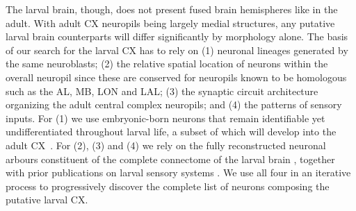     The larval brain, though, does not present fused brain hemispheres like in the adult.
    With adult CX neuropils being largely medial structures, any putative larval brain counterparts will differ significantly by morphology alone.
    The basis of our search for the larval CX has to rely on (1) neuronal lineages generated by the same neuroblasts; (2) the relative spatial location of neurons within the overall neuropil since these are conserved for neuropils known to be homologous such as the AL, MB, LON and LAL; (3) the synaptic circuit architecture organizing the adult central complex neuropils; and (4) the patterns of sensory inputs.
    For (1) we use embryonic-born neurons that remain identifiable yet undifferentiated throughout larval life, a subset of which will develop into the adult CX~\citep{andrade2019developmentally}.
    For (2), (3) and (4) we rely on the fully reconstructed neuronal arbours constituent of the complete connectome of the larval brain \citep{winding2023connectome}, together with prior publications on larval sensory systems \citep{mast2014pheromones, ohyama2015multilevel, berck2016wiring, schlegel2016synaptic, larderet2017opticlobe, miroschnikow2018convergence, huckesfeld2021unveiling, hernandez2021thermo}.
    We use all four in an iterative process to progressively discover the complete list of neurons composing the putative larval CX.



